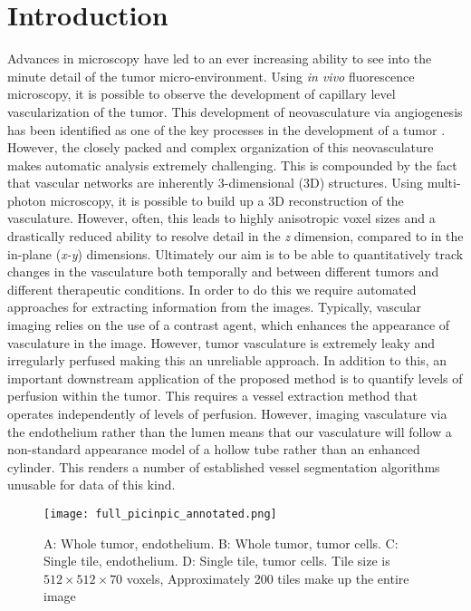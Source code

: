 \documentclass[journal,transmag]{IEEEtran}
\begin{document}
\section{Introduction}
Advances in microscopy have led to an ever increasing ability to see into the minute detail of the tumor micro-environment. Using \textit{in vivo} fluorescence microscopy, it is possible to observe the development of capillary level vascularization of the tumor. This development of neovasculature via angiogenesis has been identified as one of the key processes in the development of a tumor \cite{Hanahan2011}. However, the closely packed and complex organization of this neovasculature makes automatic analysis extremely challenging. This is compounded by the fact that vascular networks are inherently 3-dimensional (3D) structures. Using multi-photon microscopy, it is possible to build up a 3D reconstruction of the vasculature. However, often, this leads to highly anisotropic voxel sizes and a drastically reduced ability to resolve detail in the \textit{z} dimension, compared to in the in-plane (\textit{x-y}) dimensions. Ultimately our aim is to be able to quantitatively track changes in the vasculature both temporally and between different tumors and different therapeutic conditions. In order to do this we require automated approaches for extracting information from the images. Typically, vascular imaging relies on the use of a contrast agent, which enhances the appearance of vasculature in the image. However, tumor vasculature is extremely leaky and irregularly perfused making this an unreliable approach. In addition to this, an important downstream application of the proposed method is to quantify levels of perfusion within the tumor. This requires a vessel extraction method that operates independently of levels of perfusion. However, imaging vasculature via the endothelium rather than the lumen means that our vasculature will follow a non-standard appearance model of a hollow tube rather than an enhanced cylinder. This renders a number of established vessel segmentation algorithms unusable for data of this kind.

\begin{figure}[t]
\centering
\texttt{[image: full\_picinpic\_annotated.png]}
\caption{A: Whole tumor, endothelium. B: Whole tumor, tumor cells. C: Single tile, endothelium. D: Single tile, tumor cells. Tile size is $512 \times 512 \times 70$ voxels, Approximately 200 tiles make up the entire image}
\end{figure}
\end{document}
